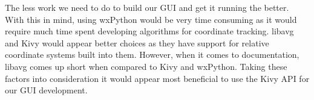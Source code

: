 \documentclass[journal,10pt,onecolumn,compsoc]{IEEEtran} \usepackage[margin=1.0in]{geometry} \usepackage{pdfpages} \usepackage{graphicx}
\begin{document}
\noindent The less work we need to do to build our GUI and get it running the better.
With this in mind, using wxPython would be very time consuming as it would require much time spent developing algorithms for coordinate tracking.
libavg and Kivy would appear better choices as they have support for relative coordinate systems built into them.
However, when it comes to documentation, libavg comes up short when compared to Kivy and wxPython.
Taking these factors into consideration it would appear most beneficial to use the Kivy API for our GUI development.

\newpage


\end{document}
